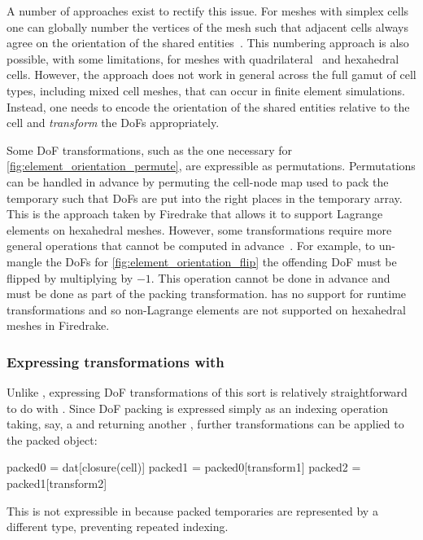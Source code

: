 \documentclass[thesis]{subfiles}
\begin{document}
A number of approaches exist to rectify this issue.
For meshes with simplex cells one can globally number the vertices of the mesh such that adjacent cells always agree on the orientation of the shared entities~\cite{rognesEfficientAssemblyDiv2010}.
This numbering approach is also possible, with some limitations, for meshes with quadrilateral~\cite{homolyaParallelEdgeOrientation2016} and hexahedral~\cite{agelekOrientingEdgesUnstructured2017} cells.
However, the approach does not work in general across the full gamut of cell types, including mixed cell meshes, that can occur in finite element simulations.
Instead, one needs to encode the orientation of the shared entities relative to the cell and \emph{transform} the DoFs appropriately.

Some DoF transformations, such as the one necessary for \cref{fig:element_orientation_permute}, are expressible as permutations.
Permutations can be handled in advance by permuting the cell-node map used to pack the temporary such that DoFs are put into the right places in the temporary array.
This is the approach taken by Firedrake that allows it to support Lagrange elements on hexahedral meshes.
However, some transformations require more general operations that cannot be computed in advance~\cite{scroggsBasixRuntimeFinite2022,scroggsConstructionArbitraryOrder2021}.
For example, to un-mangle the DoFs for \cref{fig:element_orientation_flip} the offending DoF must be flipped by multiplying by $-1$.
This operation cannot be done in advance and must be done as part of the packing transformation.
 has no support for runtime transformations and so non-Lagrange elements are not supported on hexahedral meshes in Firedrake.

\subsubsection{Expressing transformations with }
\label{sec:firedrake_orientations_pyop3}

Unlike , expressing DoF transformations of this sort is relatively straightforward to do with .
Since DoF packing is expressed simply as an indexing operation taking, say, a  and returning another , further transformations can be applied to the packed object:
\begin{pyinline}
  packed0 = dat[closure(cell)]
  packed1 = packed0[transform1]
  packed2 = packed1[transform2]
\end{pyinline}
This is not expressible in  because packed temporaries are represented by a different type, preventing repeated indexing.
\end{document}
